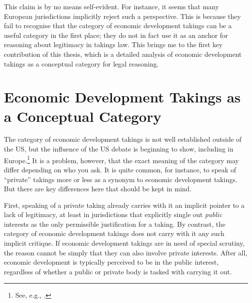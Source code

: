 This claim is by no means self-evident. For instance, it seems that many European jurisdictions implicitly reject such a perspective. This is because they fail to recognise that the category of economic development takings can be a useful category in the first place; they do not in fact use it as an anchor for reasoning about legitimacy in takings law. This brings me to the first key contribution of this thesis, which is a detailed analysis of economic development takings as a conceptual category for legal reasoning.

\section{Economic Development Takings as a Conceptual Category}

The category of economic development takings is not well established outside of the US, but the influence of the US debate is beginning to show, including in Europe.\footnote{See, e.g., \cite{verstappen14}.} It is a problem, however, that the exact meaning of the category may differ depending on who you ask. It is quite common, for instance, to speak of ``private'' takings more or less as a synonym to economic development takings. But there are key differences here that should be kept in mind.

First, speaking of a private taking already carries with it an implicit pointer to a lack of legitimacy, at least in jurisdictions that explicitly single out {\it public} interests as the only permissible justification for a taking. By contrast, the category of economic development takings does not carry with it any such implicit critique. If economic development takings are in need of special scrutiny, the reason cannot be simply that they can also involve private interests. After all, economic development is typically perceived to be in the public interest, regardless of whether a public or private body is tasked with carrying it out.

